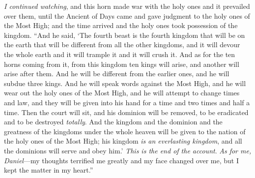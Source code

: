 \begin{biblechapter}
\verse \textit{I continued watching}, and this horn made war with the holy ones and it prevailed over them,
\verse until the Ancient of Days came and gave judgment to the holy ones of the Most High; and the time arrived and the holy ones took possession of the kingdom.
\verse “And he said, ‘The fourth beast is the fourth kingdom that will be on the earth that will be different from all the other kingdoms, and it will devour the whole earth and it will trample it and it will crush it.
\verse And as for the ten horns coming from it, from this kingdom ten kings will arise, and another will arise after them. And he will be different from the earlier ones, and he will subdue three kings.
\verse And he will speak words against the Most High, and he will wear out the holy ones of the Most High, and he will attempt to change times and law, and they will be given into his hand for a time and two times and half a time.
\verse Then the court will sit, and his dominion will be removed, to be eradicated and to be destroyed \textit{totally}.
\verse And the kingdom and the dominion and the greatness of the kingdoms under the whole heaven will be given to the nation of the holy ones of the Most High; his kingdom \textit{is an everlasting kingdom}, and all the dominions will serve and obey him.’
\verse \textit{This is the end of the account}. \textit{As for me, Daniel}—my thoughts terrified me greatly and my face changed over me, but I kept the matter in my heart.”
\end{biblechapter}

